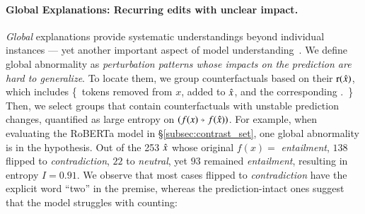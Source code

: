 \paragraph{Global Explanations: Recurring edits with unclear impact.}
\label{subsec:global_exp}
\emph{Global} explanations provide systematic understandings beyond individual instances --- yet another important aspect of model understanding~\cite{miller}.
We define global abnormality as \emph{perturbation patterns whose impacts on the prediction are hard to generalize}.
To locate them, we group counterfactuals based on their $\operatorname*{r}(\hat{x})$, which includes 
\{\ tokens removed from $x$, added to $\hat{x}$, and the corresponding \tagstr.\ \}
Then, we select groups that contain counterfactuals with unstable prediction changes, quantified as large entropy on $(f(x) \veryshortarrow f(\xp))$.
For example, when evaluating the \nli RoBERTa model in \S\ref{subsec:contrast_set}, one global abnormality is  in the hypothesis.
Out of the 253 $\hat{x}$ whose original $f(x)=$ \emph{entailment}, $138$ flipped to \emph{contradiction}, $22$ to \emph{neutral}, yet $93$ remained \emph{entailment}, resulting in entropy $I=0.91$.
We observe that most cases flipped to \emph{contradiction} have the explicit word ``two'' in the premise, whereas the prediction-intact ones suggest that the model struggles with counting:


